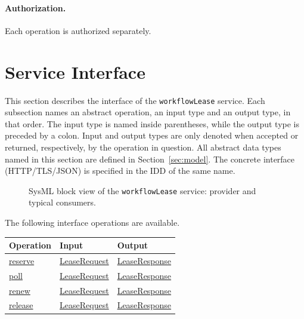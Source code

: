 \documentclass[a4paper]{arrowhead}
\newcommand{\mref}[1]{{\textcolor{ArrowheadPurple}{\hyperref[sec:model:#1]{#1}}}}
\newcommand{\oref}[1]{{\textcolor{ArrowheadBlue}{\hyperref[sec:operations:#1]{#1}}}}
\begin{document}
\paragraph{Authorization.} Each operation is authorized separately.

\newpage
\section{Service Interface}
\label{sec:operations}
This section describes the interface of the \texttt{workflowLease} service. Each subsection names an abstract operation,
an input type and an output type, in that order. The input type is named inside parentheses, while the output type is
preceded by a colon. Input and output types are only denoted when accepted or returned, respectively, by the operation
in question. All abstract data types named in this section are defined in Section~\ref{sec:model}. The concrete
interface (HTTP/TLS/JSON) is specified in the IDD of the same name.

\begin{figure}[ht!]
  \centering
  \caption{SysML block view of the \texttt{workflowLease} service: provider and typical consumers.}
  \label{fig:SD}
\end{figure}

The following interface operations are available.

{\small
\begin{longtable}{|p{4.4cm}|p{5.6cm}|p{5.8cm}|}

\hline
\rowcolor{gray!33} Operation & Input & Output \\ \hline
\endhead
\oref{reserve} & \mref{LeaseRequest} & \mref{LeaseResponse} \\ \hline
\oref{poll} & \mref{LeaseRequest} & \mref{LeaseResponse} \\ \hline
\oref{renew} & \mref{LeaseRequest} & \mref{LeaseResponse} \\ \hline
\oref{release} & \mref{LeaseRequest} & \mref{LeaseResponse} \\ \hline
\end{longtable}
}
\end{document}
